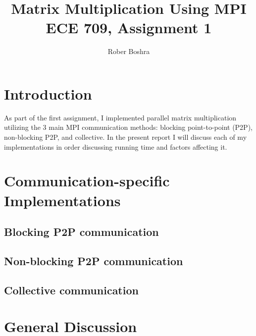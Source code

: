 \documentclass[12pt]{report}
\author{Rober Boshra}
\title{Matrix Multiplication Using MPI\\ECE 709, Assignment 1}
\begin{document}
\maketitle
\chapter{Introduction}
As part of the first assignment, I implemented parallel matrix multiplication utilizing the 3 main MPI communication methods: blocking point-to-point (P2P), non-blocking P2P, and collective. In the present report I will discuss each of my implementations in order discussing running time and factors affecting it.

\chapter{Communication-specific Implementations}
\section{Blocking P2P communication}

\section{Non-blocking P2P communication}

\section{Collective communication}

\chapter{General Discussion}
\end{document}
